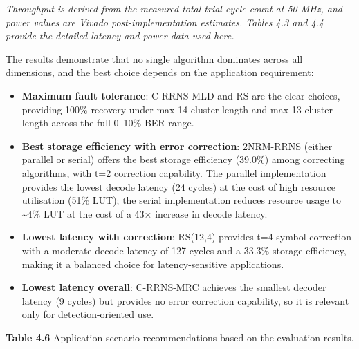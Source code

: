 \documentclass[
  12pt,
  a4paper]{report}
\begin{document}
\emph{Throughput is derived from the measured total trial cycle count at
50 MHz, and power values are Vivado post-implementation estimates.
Tables 4.3 and 4.4 provide the detailed latency and power data used
here.}

The results demonstrate that no single algorithm dominates across all
dimensions, and the best choice depends on the application requirement:

\begin{itemize}
\item
  \textbf{Maximum fault tolerance}: C-RRNS-MLD and RS are the clear
  choices, providing 100\% recovery under max 14 cluster length and max
  13 cluster length across the full 0--10\% BER range.
\item
  \textbf{Best storage efficiency with error correction}: 2NRM-RRNS
  (either parallel or serial) offers the best storage efficiency
  (39.0\%) among correcting algorithms, with t=2 correction capability.
  The parallel implementation provides the lowest decode latency (24
  cycles) at the cost of high resource utilisation (51\% LUT); the
  serial implementation reduces resource usage to \textasciitilde4\% LUT
  at the cost of a 43× increase in decode latency.
\item
  \textbf{Lowest latency with correction}: RS(12,4) provides t=4 symbol
  correction with a moderate decode latency of 127 cycles and a 33.3\%
  storage efficiency, making it a balanced choice for latency-sensitive
  applications.
\item
  \textbf{Lowest latency overall}: C-RRNS-MRC achieves the smallest
  decoder latency (9 cycles) but provides no error correction
  capability, so it is relevant only for detection-oriented use.
\end{itemize}

\textbf{Table 4.6} Application scenario recommendations based on the
evaluation results.
\end{document}
